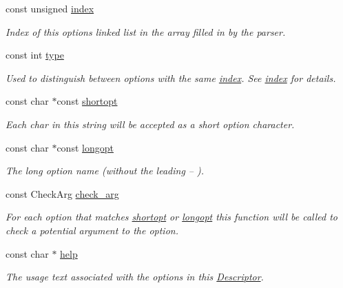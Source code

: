 \begin{DoxyCompactItemize}
\item 
const unsigned \hyperlink{structxmem_1_1config_1_1third__party_1_1_descriptor_aacf3d44f35c61f22be65da078f60734b}{index}
\begin{DoxyCompactList}\small\item\em Index of this option\textquotesingle{}s linked list in the array filled in by the parser. \end{DoxyCompactList}\item 
const int \hyperlink{structxmem_1_1config_1_1third__party_1_1_descriptor_a4b9e9a5c9b08ef575ea4f603c54bff63}{type}
\begin{DoxyCompactList}\small\item\em Used to distinguish between options with the same \hyperlink{structxmem_1_1config_1_1third__party_1_1_descriptor_aacf3d44f35c61f22be65da078f60734b}{index}. See \hyperlink{structxmem_1_1config_1_1third__party_1_1_descriptor_aacf3d44f35c61f22be65da078f60734b}{index} for details. \end{DoxyCompactList}\item 
const char $\ast$const \hyperlink{structxmem_1_1config_1_1third__party_1_1_descriptor_ac2dfb6bb8ca2f4aabf964a910cf0d59b}{shortopt}
\begin{DoxyCompactList}\small\item\em Each char in this string will be accepted as a short option character. \end{DoxyCompactList}\item 
const char $\ast$const \hyperlink{structxmem_1_1config_1_1third__party_1_1_descriptor_a7246a4bfc669f68bb406dece398be7bb}{longopt}
\begin{DoxyCompactList}\small\item\em The long option name (without the leading {\ttfamily --} ). \end{DoxyCompactList}\item 
const Check\+Arg \hyperlink{structxmem_1_1config_1_1third__party_1_1_descriptor_a65b39f8d61de820bb5001d590e7dea5d}{check\+\_\+arg}
\begin{DoxyCompactList}\small\item\em For each option that matches \hyperlink{structxmem_1_1config_1_1third__party_1_1_descriptor_ac2dfb6bb8ca2f4aabf964a910cf0d59b}{shortopt} or \hyperlink{structxmem_1_1config_1_1third__party_1_1_descriptor_a7246a4bfc669f68bb406dece398be7bb}{longopt} this function will be called to check a potential argument to the option. \end{DoxyCompactList}\item 
const char $\ast$ \hyperlink{structxmem_1_1config_1_1third__party_1_1_descriptor_a099340907003981132a053856dac0eaa}{help}
\begin{DoxyCompactList}\small\item\em The usage text associated with the options in this \hyperlink{structxmem_1_1config_1_1third__party_1_1_descriptor}{Descriptor}. \end{DoxyCompactList}\end{DoxyCompactItemize}


